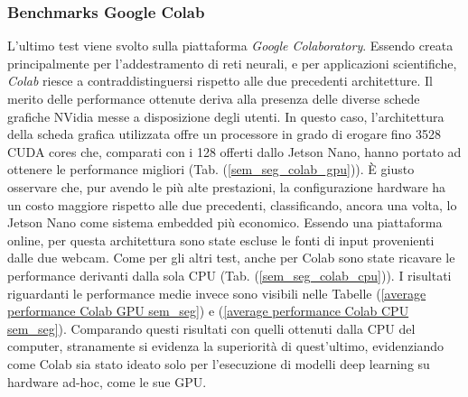 \subsubsection{Benchmarks Google Colab}
L'ultimo test viene svolto sulla piattaforma \emph{Google Colaboratory}. Essendo 
creata principalmente per l'addestramento di reti neurali, e per applicazioni 
scientifiche, \emph{Colab} riesce a contraddistinguersi rispetto alle due precedenti 
architetture. Il merito delle performance ottenute deriva alla presenza delle 
diverse schede grafiche NVidia messe a disposizione degli utenti. In questo caso, 
l'architettura della scheda grafica utilizzata offre un processore in 
grado di erogare fino 3528 CUDA cores che, comparati con i 128 offerti dallo 
Jetson Nano, hanno portato ad ottenere le performance migliori (Tab. (\ref{sem_seg_colab_gpu})). È 
giusto osservare che, pur avendo le più alte prestazioni, la configurazione 
hardware ha un costo maggiore rispetto alle due precedenti, classificando, 
ancora una volta, lo Jetson Nano come sistema embedded più economico. 
Essendo una piattaforma online, per questa architettura sono state escluse 
le fonti di input provenienti dalle due webcam. Come per gli altri test, anche per 
Colab sono state ricavare le performance derivanti dalla sola CPU (Tab. (\ref{sem_seg_colab_cpu})). 
I risultati riguardanti le performance medie invece sono visibili nelle Tabelle (\ref{average performance Colab GPU sem_seg}) e (\ref{average performance Colab CPU sem_seg}).
Comparando questi risultati con quelli ottenuti dalla CPU del computer, 
stranamente si evidenza la superiorità di quest'ultimo, evidenziando 
come Colab sia stato ideato solo per l'esecuzione di modelli deep learning su 
hardware ad-hoc, come le sue GPU.

